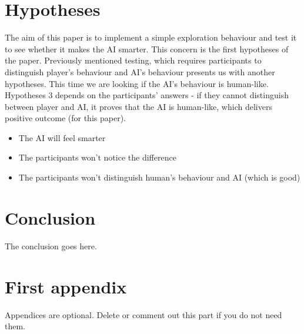 \documentclass[journal]{IEEEtran}
\begin{document}
\section{Hypotheses}
The aim of this paper is to implement a simple exploration behaviour and test it to see whether it makes the AI smarter. This concern is the first hypotheses of the paper. Previously mentioned testing, which requires participants to distinguish player's behaviour and AI's behaviour presents us with another hypotheses. This time we are looking if the AI's behaviour is human-like. Hypotheses 3 depends on the participants' answers - if they cannot distinguish between player and AI, it proves that the AI is human-like, which delivers positive outcome (for this paper).
\begin{itemize}
	\item The AI will feel smarter
	\item The participants won't notice the difference
	\item The participants won't distinguish human's behaviour and AI (which is good)
\end{itemize}

\section{Conclusion}
The conclusion goes here.






\appendices
\section{First appendix}
Appendices are optional. Delete or comment out this part if you do not need them.

\end{document}
